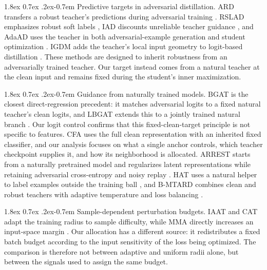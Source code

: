 \documentclass{article} %
\makeatletter
\theoremstyle{plain}
\renewcommand{\paragraph}{\@startsection{paragraph}{4}{\z@}%
  {1.8ex \@plus 0.7ex \@minus .2ex}{-0.7em}%
  {\normalfont\normalsize\bfseries}}
\makeatother
\begin{document}
\paragraph{Predictive targets in adversarial distillation.}
ARD transfers a robust teacher's predictions during adversarial training \citep{ard}. RSLAD emphasizes
robust soft labels \citep{rslad}, IAD discounts unreliable teacher guidance \citep{iad}, and AdaAD uses
the teacher in both adversarial-example generation and student optimization \citep{adaad}. IGDM adds
the teacher's local input geometry to logit-based distillation \citep{igdm}. These methods are designed
to inherit robustness from an adversarially trained teacher. Our target instead comes from a natural
teacher at the clean input and remains fixed during the student's inner maximization.

\paragraph{Guidance from naturally trained models.}
BGAT is the closest direct-regression precedent: it matches adversarial logits to a fixed natural
teacher's clean logits, and LBGAT extends this to a jointly trained natural branch \citep{lbgat}.
Our logit control confirms that this fixed-clean-target principle is not specific to features. CFA
uses the full clean representation with an inherited fixed classifier, and our analysis focuses on
what a single anchor controls, which teacher checkpoint supplies it, and how its neighborhood is
allocated. ARREST starts
from a naturally pretrained model and regularizes latent representations while retaining adversarial
cross-entropy and noisy replay \citep{arrest}. HAT uses a natural helper to label examples outside the
training ball \citep{hat}, and B-MTARD combines clean and robust teachers with adaptive temperature
and loss balancing \citep{bmtard}.

\paragraph{Sample-dependent perturbation budgets.}
IAAT and CAT adapt the training radius to sample difficulty, while MMA directly increases an
input-space margin \citep{iaat,cat,mma}. Our allocation has a different source: it redistributes a
fixed batch budget according to the input sensitivity of the loss being optimized. The comparison is
therefore not between adaptive and uniform radii alone, but between the signals used to assign the
same budget.
\end{document}
